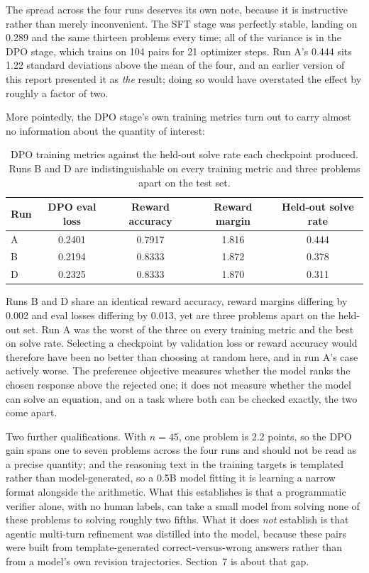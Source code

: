 \documentclass[11pt]{article}
\begin{document}
The spread across the four runs deserves its own note, because it is
instructive rather than merely inconvenient. The SFT stage was perfectly
stable, landing on 0.289 and the same thirteen problems every time; all of
the variance is in the DPO stage, which trains on 104 pairs for 21 optimizer
steps. Run A's 0.444 sits 1.22 standard deviations above the mean of the
four, and an earlier version of this report presented it as \emph{the}
result; doing so would have overstated the effect by roughly a factor of two.

More pointedly, the DPO stage's own training metrics turn out to carry
almost no information about the quantity of interest:

\begin{table}[h]
\centering
\begin{tabular}{lcccc}
\toprule
Run & DPO eval loss & Reward accuracy & Reward margin & Held-out solve rate \\
\midrule
A & 0.2401 & 0.7917 & 1.816 & 0.444 \\
B & 0.2194 & 0.8333 & 1.872 & 0.378 \\
D & 0.2325 & 0.8333 & 1.870 & 0.311 \\
\bottomrule
\end{tabular}
\caption{DPO training metrics against the held-out solve rate each checkpoint produced. Runs B and D are indistinguishable on every training metric and three problems apart on the test set.}
\end{table}

Runs B and D share an identical reward accuracy, reward margins differing by
0.002 and eval losses differing by 0.013, yet are three problems apart on
the held-out set. Run A was the worst of the three on every training metric
and the best on solve rate. Selecting a checkpoint by validation loss or
reward accuracy would therefore have been no better than choosing at random
here, and in run A's case actively worse. The preference objective measures
whether the model ranks the chosen response above the rejected one; it does
not measure whether the model can solve an equation, and on a task where
both can be checked exactly, the two come apart.

Two further qualifications. With $n=45$, one problem is 2.2 points, so the
DPO gain spans one to seven problems across the four runs and should not be
read as a precise quantity; and the reasoning text in the training targets is templated
rather than model-generated, so a 0.5B model fitting it is learning a narrow
format alongside the arithmetic. What this establishes is that a
programmatic verifier alone, with no human labels, can take a small model
from solving none of these problems to solving roughly two fifths. What it does
\emph{not} establish is that agentic multi-turn refinement was distilled
into the model, because these pairs were built from template-generated
correct-versus-wrong answers rather than from a model's own revision
trajectories. Section~7 is about that gap.
\end{document}
